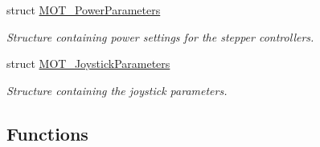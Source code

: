 \begin{DoxyCompactItemize}
struct \hyperlink{struct_m_o_t___power_parameters}{M\+O\+T\+\_\+\+Power\+Parameters}
\begin{DoxyCompactList}\small\item\em Structure containing power settings for the stepper controllers. \end{DoxyCompactList}\item 
struct \hyperlink{struct_m_o_t___joystick_parameters}{M\+O\+T\+\_\+\+Joystick\+Parameters}
\begin{DoxyCompactList}\small\item\em Structure containing the joystick parameters. \end{DoxyCompactList}\end{DoxyCompactItemize}
\subsection*{Functions}
